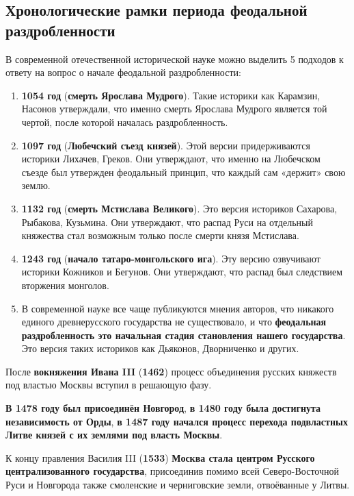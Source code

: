 \documentclass{article}
\begin{document}
\subsection{Хронологические рамки периода феодальной раздробленности}

В современной отечественной исторической науке можно выделить 5 подходов к ответу на вопрос о начале феодальной раздробленности:

\begin{enumerate}
    \item \textbf{1054 год} (\textbf{смерть Ярослава Мудрого}). Такие историки как Карамзин, Насонов утверждали, что именно смерть Ярослава Мудрого является той чертой, после которой началась раздробленность.
    \item \textbf{1097 год} (\textbf{Любечский съезд князей}). Этой версии придерживаются историки Лихачев, Греков. Они утверждают, что именно на Любечском съезде был утвержден феодальный принцип, что каждый сам «держит» свою землю.
    \item \textbf{1132 год} (\textbf{смерть Мстислава Великого}). Это версия историков Сахарова, Рыбакова, Кузьмина. Они утверждают, что распад Руси на отдельный княжества стал возможным только после смерти князя Мстислава.
    \item \textbf{1243 год} (\textbf{начало татаро-монгольского ига}). Эту версию озвучивают историки Кожников и Бегунов. Они утверждают, что распад был следствием вторжения монголов.
    \item В современной науке все чаще публикуются мнения авторов, что никакого единого древнерусского государства не существовало, и что \textbf{феодальная раздробленность это начальная стадия становления нашего государства}. Это версия таких историков как Дьяконов, Дворниченко и других.
\end{enumerate}

После \textbf{вокняжения Ивана III} (\textbf{1462}) процесс объединения русских княжеств под властью Москвы вступил в решающую фазу.

\textbf{В 1478 году был присоединён Новгород}, \textbf{в 1480 году была достигнута независимость от Орды}, \textbf{в 1487 году начался процесс перехода подвластных Литве князей с их землями под власть Москвы}.

\hfill

К концу правления Василия III (\textbf{1533}) \textbf{Москва стала центром Русского централизованного государства}, присоединив помимо всей Северо-Восточной Руси и Новгорода также смоленские и черниговские земли, отвоёванные у Литвы.
\end{document}
